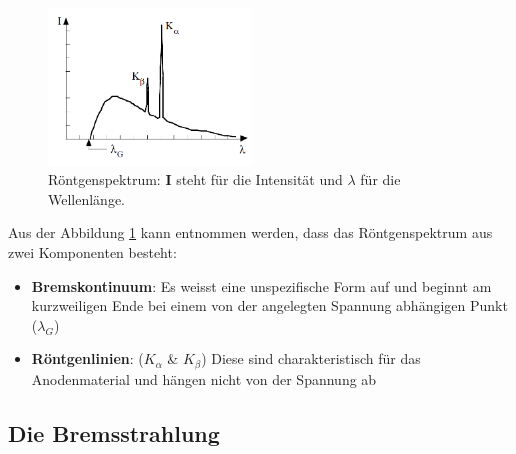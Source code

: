 \begin{figure}
\includegraphics[width=0.48\textwidth]{Bilder/roentgen_spektrum.png}
\caption[Röntgenspektrum]{Röntgenspektrum: \textbf{I} steht für die Intensität und $\lambda$ für die Wellenlänge.}
\vspace{-1.5cm}
\label{fig:roentgenspektrum}
\end{figure}
Aus der Abbildung \ref{fig:roentgenspektrum} kann entnommen werden, dass das Röntgenspektrum aus zwei Komponenten besteht:
\begin{itemize}
\item \textbf{Bremskontinuum}: Es weisst eine unspezifische Form auf und beginnt am kurzweiligen Ende bei einem von der angelegten Spannung abhängigen Punkt ($\lambda_{G}$)
\item \textbf{Röntgenlinien}: ($K_{\alpha}$ \& $K_{\beta}$) Diese sind charakteristisch für das Anodenmaterial und hängen nicht von der Spannung ab
\end{itemize}

\subsection{Die Bremsstrahlung}
\blindtext